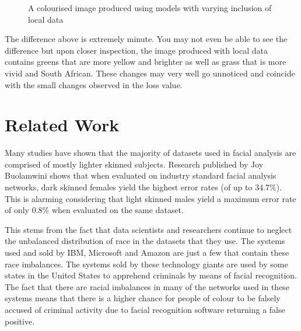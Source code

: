 \documentclass[conference]{IEEEtran}
\begin{document}
\begin{figure}[h]
    \centering
    \qquad
    \caption{A colourised image produced using models with varying inclusion of local data}%
    \label{fig:inclusion_compare}
\end{figure}

The difference above is extremely minute. You may not even be able to see the difference but upon closer inspection, the image produced with local data contains greens that are more yellow and brighter as well as grass that is more vivid and South African. These changes may very well go unnoticed and coincide with the small changes observed in the loss value.

\section{Related Work}

Many studies have shown that the majority of datasets used in facial analysis are comprised of mostly lighter skinned subjects. Research published by Joy Buolamwini \cite{buolamwini2018gender} shows that when evaluated on industry standard facial analysis networks, dark skinned females yield the highest error rates (of up to 34.7\%). This is alarming considering that light skinned males yield a maximum error rate of only 0.8\% when evaluated on the same dataset. \cite{corbett2018measure}

This stems from the fact that data scientists and researchers continue to neglect the unbalanced distribution of race in the datasets that they use. The systems used and sold by IBM, Microsoft and Amazon are just a few that contain these race imbalances. The systems sold by these technology giants are used by some states in the United States to apprehend criminals by means of facial recognition. The fact that there are racial imbalances in many of the networks used in these systems means that there is a higher chance for people of colour to be falsely accused of criminal activity due to facial recognition software returning a false positive. 
\end{document}
